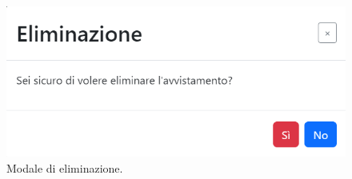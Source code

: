\documentclass[a4paper,final,12pt]{report}
\begin{document}
\begin{figure}[hbtp]
\centering
\includegraphics[scale=0.70]{img_concettuale/eliminazione.png}
\caption{Modale di eliminazione.}
\label{figura:modelimavvwebsu}
\end{figure}
\newpage
\end{document}
